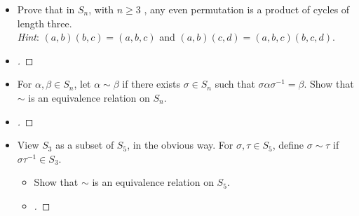 \documentclass[paper=usletter, fontsize=12pt]{article}
\begin{document}
\begin{itemize}
\begin{itemize}
\begin{proof}[\unskip\nopunct]
\begin{align*}
\begin{tabular}{cccccc}
                        \end{tabular}
                    \right)\\
                    & = \left(
                        \begin{tabular}{cccccc}
                            1 & 2 & 3 & \ldots & m-1 & m \\
                            m & 2 & 3 & \ldots & m-1 & 1
                        \end{tabular}
                    \right)\\
                    & = (1,m) \qedhere
                \end{align*}
                \endgroup
            \end{proof}
            \vspace{0.2in}

            \item[\textbf{11}] Prove that in $S_n$, with $n \ge 3$ , any even
            permutation is a product of cycles of length three.\\
            \textit{Hint}: $(a,b)(b,c)=(a,b,c)$ and
            $(a,b)(c,d)=(a,b,c)(b,c,d)$.
            \item[\textbf{Ans}]
            \begin{proof}[\unskip\nopunct]
            \end{proof}
            \vspace{0.2in}

            \item[\textbf{15}] For $\alpha,\beta \in  S_n$, let
            $\alpha\sim\beta$ if there exists $\sigma \in S_n$ such that
            $\sigma\alpha\sigma^{-1}=\beta$. Show that $\sim$ is an equivalence
            relation on $S_n$.
            \item[\textbf{Ans}]
            \begin{proof}[\unskip\nopunct]
            \end{proof}
            \vspace{0.2in}

            \item[\textbf{16}] View $S_3$ as a subset of $S_5$, in the obvious
            way. For $\sigma, \tau \in S_5$, define $\sigma \sim \tau$ if
            $\sigma\tau^{-1} \in S_3$.
            \begin{itemize}

                \item[\textbf{a}] Show that $\sim$ is an equivalence relation
                on $S_5$.
                \item[\textbf{Ans}]
                \begin{proof}[\unskip\nopunct]
                \end{proof}
                \vspace{0.2in}


\end{itemize}
\end{itemize}
\end{itemize}
\end{document}
